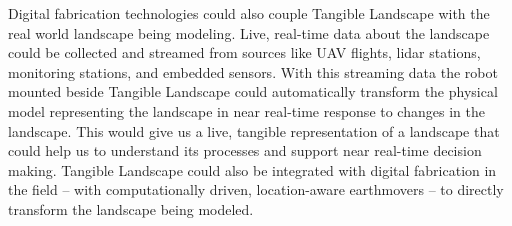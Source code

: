 \documentclass{article}
\begin{document}
Digital fabrication technologies could also couple Tangible Landscape with the real world landscape being modeling.
Live, real-time data about the landscape could be collected and streamed from sources like UAV flights, lidar stations, monitoring stations, and embedded sensors. With this streaming data the robot mounted beside Tangible Landscape could automatically transform the physical model representing the landscape in near real-time response to changes in the landscape. 
%
This would give us a live, tangible representation of a landscape that could help us to understand its processes 
and support near real-time decision making. 
%
Tangible Landscape could also be integrated with digital fabrication in the field -- 
with computationally driven, location-aware earthmovers -- 
to directly transform the landscape being modeled. 



























 
\end{document}
